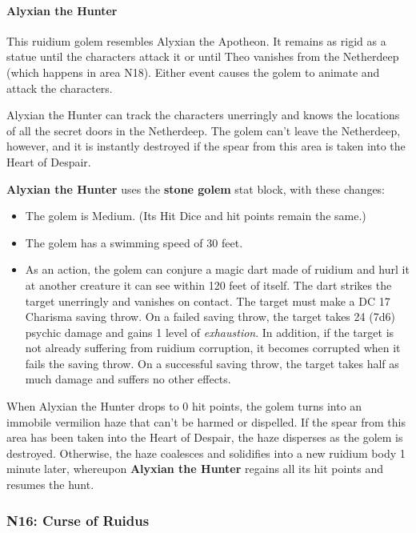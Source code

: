 \documentclass[letterpaper, 11pt, bg=full, twocolumn]{dndbook}
\begin{document}
\paragraph{Alyxian the Hunter}

This ruidium golem resembles Alyxian the Apotheon. It remains as rigid as a statue until the characters attack it or until Theo vanishes from the Netherdeep (which happens in area N18). Either event causes the golem to animate and attack the characters.

Alyxian the Hunter can track the characters unerringly and knows the locations of all the secret doors in the Netherdeep. The golem can't leave the Netherdeep, however, and it is instantly destroyed if the spear from this area is taken into the Heart of Despair.

\textbf{Alyxian the Hunter} uses the \textbf{stone golem} stat block, with these changes:

\begin{itemize}
\item The golem is Medium. (Its Hit Dice and hit points remain the same.)
\item The golem has a swimming speed of 30 feet.
\item As an action, the golem can conjure a magic dart made of ruidium and hurl it at another creature it can see within 120 feet of itself. The dart strikes the target unerringly and vanishes on contact. The target must make a DC 17 Charisma saving throw. On a failed saving throw, the target takes 24 (7d6) psychic damage and gains 1 level of \textit{exhaustion}. In addition, if the target is not already suffering from ruidium corruption, it becomes corrupted when it fails the saving throw. On a successful saving throw, the target takes half as much damage and suffers no other effects.
\end{itemize}

When Alyxian the Hunter drops to 0 hit points, the golem turns into an immobile vermilion haze that can't be harmed or dispelled. If the spear from this area has been taken into the Heart of Despair, the haze disperses as the golem is destroyed. Otherwise, the haze coalesces and solidifies into a new ruidium body 1 minute later, whereupon \textbf{Alyxian the Hunter} regains all its hit points and resumes the hunt.

\subsubsection{N16: Curse of Ruidus}
\end{document}
